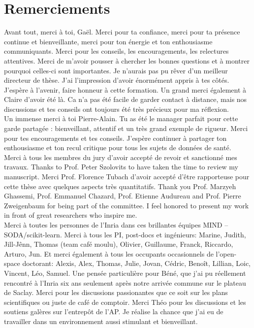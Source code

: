 \documentclass[french,12pt,twoside,a4paper]{book}
\begin{document}
\newpage
\chapter*{Remerciements}

Avant tout, merci à toi, Gaël. Merci pour ta confiance, merci pour ta présence
continue et bienveillante, merci pour ton énergie et ton enthousiasme
communiquants. Merci pour les conseils, les encouragements, les relectures
attentives. Merci de m'avoir pousser à chercher les bonnes questions et à
montrer pourquoi celles-ci sont importantes. Je n'aurais pas pu rêver d'un
meilleur directeur de thèse. J'ai l'impression d'avoir énormément appris à tes
côtés. J'espère à l'avenir, faire honneur à cette formation. Un grand merci
également à Claire d'avoir été là. Ca n'a pas été facile de garder contact à
distance, mais nos discussions et tes conseils ont toujours été très précieux
pour ma réflexion.\\

% 
Un immense merci à toi Pierre-Alain. Tu as été le manager parfait pour cette
garde partagée :  bienveillant, attentif et un très grand exemple de
rigueur. Merci pour tes encouragements et tes conseils. J'espère continuer à
partager ton enthousiasme et ton recul critique pour tous les sujets de données
de santé.\\

Merci à tous les membres du jury d'avoir accepté de revoir et sanctionné mes
travaux. Thanks to Prof. Peter Szolovits to have taken the time to review my
manuscript. Merci Prof. Florence Tubach d'avoir accepté d'être rapporteuse pour
cette thèse avec quelques aspects très quantitatifs. Thank you Prof. Marzyeh
Ghassemi, Prof. Emmanuel Chazard, Prof. Etienne Audureau and Prof. Pierre
Zweigenbaum for being part of the committee. I feel honored to present my work
in front of great researchers who inspire me.\\

Merci à toutes les personnes de l'Inria dans ces brillantes équipes
MIND -- SODA/scikit-learn. Merci à tous les PI, post-docs et ingénieurs: Marine, Judith,
Jill-Jênn, Thomas (team café moulu), Olivier, Guillaume, Franck, Riccardo, Arturo, Jun.
Et merci également à tous les occupants occasionnels de l'open-space doctorant:
Alexis, Alex, Thomas, Julie, Jovan, Cédric, Benoît, Lillian, Loic, Vincent, Léo, Samuel. Une
pensée particulière pour Béné, que j'ai pu réellement rencontré à l'Inria six
ans seulement après notre arrivée commune sur le plateau de Saclay. Merci pour les
discussions passionantes que ce soit sur les plans scientifiques ou juste de
café de comptoir. Merci Théo pour les discussions et les soutiens galères sur
l'entrepôt de l'AP. Je réalise la chance que j'ai eu de travailler dans un
environnement aussi stimulant et bienveillant.\\
\end{document}
